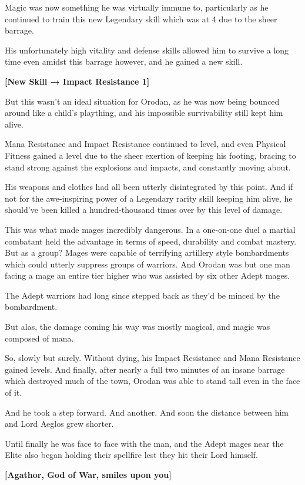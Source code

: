 \documentclass[a4paper,10pt]{book}
\begin{document}
Magic was now something he was virtually immune to, particularly as he continued to train this new Legendary skill which was at 4 due to the sheer barrage.\par
His unfortunately high vitality and defense skills allowed him to survive a long time even amidst this barrage however, and he gained a new skill.\par
\textbf{[New Skill → Impact Resistance 1]}\par
But this wasn’t an ideal situation for Orodan, as he was now being bounced around like a child’s plaything, and his impossible survivability still kept him alive.\par
Mana Resistance and Impact Resistance continued to level, and even Physical Fitness gained a level due to the sheer exertion of keeping his footing, bracing to stand strong against the explosions and impacts, and constantly moving about.\par
His weapons and clothes had all been utterly disintegrated by this point. And if not for the awe-inspiring power of a Legendary rarity skill keeping him alive, he should’ve been killed a hundred-thousand times over by this level of damage.\par
This was what made mages incredibly dangerous. In a one-on-one duel a martial combatant held the advantage in terms of speed, durability and combat mastery. But as a group? Mages were capable of terrifying artillery style bombardments which could utterly suppress groups of warriors. And Orodan was but one man facing a mage an entire tier higher who was assisted by six other Adept mages.\par
The Adept warriors had long since stepped back as they’d be minced by the bombardment.\par
But alas, the damage coming his way was mostly magical, and magic was composed of mana.\par
So, slowly but surely. Without dying, his Impact Resistance and Mana Resistance gained levels. And finally, after nearly a full two minutes of an insane barrage which destroyed much of the town, Orodan was able to stand tall even in the face of it.\par
And he took a step forward. And another. And soon the distance between him and Lord Aeglos grew shorter.\par
Until finally he was face to face with the man, and the Adept mages near the Elite also began holding their spellfire lest they hit their Lord himself.\par
\textbf{[Agathor, God of War, smiles upon you]}\par
\end{document}
